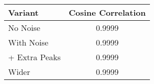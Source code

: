 \begin{tabular}{l c}
\hline
Variant & Cosine Correlation \\
\hline
No Noise & 0.9999 \\
With Noise & 0.9999 \\
+ Extra Peaks & 0.9999 \\
Wider & 0.9999 \\
\hline
\end{tabular}
